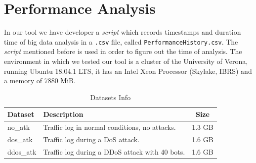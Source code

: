 \section{Performance Analysis}
In our tool we have developer a \textit{script} which records timestamps and duration time of big data analysis in a \texttt{.csv} file, called \texttt{PerformanceHistory.csv}. The \textit{script} mentioned before is used in order to figure out the time of analysis. 
The environment in which we tested our tool is a cluster of the University of Verona, running Ubuntu 18.04.1 LTS, it has an Intel Xeon Processor (Skylake, IBRS) and a memory of 7880 MiB. 

\begin{table}[h]
\centering
\begin{tabular}{|l|l|c|}
\hline
\textbf{Dataset} & \textbf{Description}                              & \textbf{Size} \\ \hline
no\_atk          & Traffic log in normal conditions, no attacks. & 1.3 GB        \\ 
dos\_atk         & Traffic log during a DoS attack.                   & 1.6 GB        \\ 
ddos\_atk        & Traffic log during a DDoS attack with 40 bots. & 1.6 GB        \\ \hline
\end{tabular}
\caption{Datasets Info}
\label{tab:dataset_info}
\end{table}

